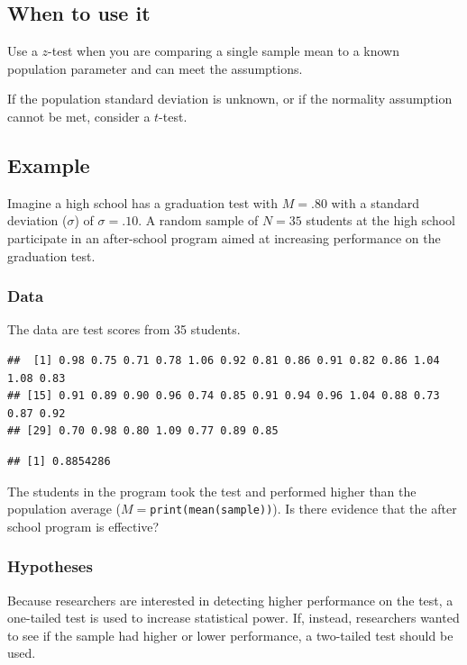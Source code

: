 \documentclass[
]{book}
\begin{document}
\hypertarget{when-to-use-it}{%
\subsection{When to use it}\label{when-to-use-it}}

Use a \(z\)-test when you are comparing a single sample mean to a known population parameter and can meet the assumptions.

If the population standard deviation is unknown, or if the normality assumption cannot be met, consider a \(t\)-test.

\hypertarget{example}{%
\subsection{Example}\label{example}}

Imagine a high school has a graduation test with \(M = .80\) with a standard deviation (\(\sigma\)) of \(\sigma = .10\). A random sample of \(N = 35\) students at the high school participate in an after-school program aimed at increasing performance on the graduation test.

\hypertarget{data}{%
\subsubsection{Data}\label{data}}

The data are test scores from 35 students.

\begin{verbatim}
##  [1] 0.98 0.75 0.71 0.78 1.06 0.92 0.81 0.86 0.91 0.82 0.86 1.04 1.08 0.83
## [15] 0.91 0.89 0.90 0.96 0.74 0.85 0.91 0.94 0.96 1.04 0.88 0.73 0.87 0.92
## [29] 0.70 0.98 0.80 1.09 0.77 0.89 0.85
\end{verbatim}

\begin{verbatim}
## [1] 0.8854286
\end{verbatim}

The students in the program took the test and performed higher than the population average (\(M=\)\texttt{print(mean(sample))}). Is there evidence that the after school program is effective?

\hypertarget{hypotheses-1}{%
\subsubsection{Hypotheses}\label{hypotheses-1}}

Because researchers are interested in detecting higher performance on the test, a one-tailed test is used to increase statistical power. If, instead, researchers wanted to see if the sample had higher or lower performance, a two-tailed test should be used.
\end{document}
